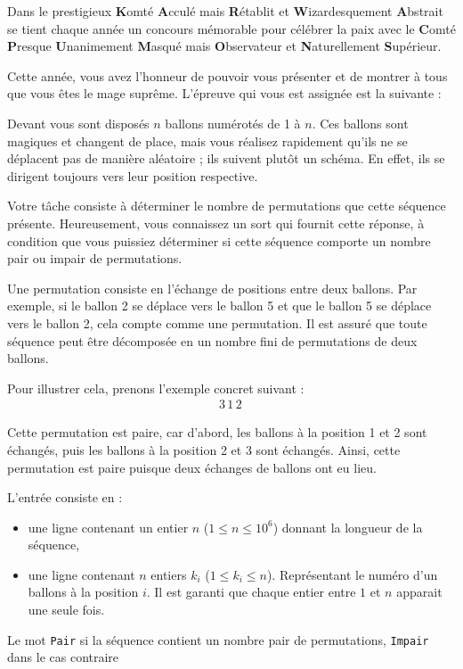 \problemname{\problemyamlname}


Dans le prestigieux \textbf{K}omté \textbf{A}cculé mais \textbf{R}établit et \textbf{W}izardesquement \textbf{A}bstrait se tient chaque année un concours mémorable pour célébrer la paix avec le \textbf{C}omté \textbf{P}resque \textbf{U}nanimement \textbf{M}asqué mais \textbf{O}bservateur et \textbf{N}aturellement \textbf{S}upérieur.

Cette année, vous avez l'honneur de pouvoir vous présenter et de montrer à tous que vous êtes le mage suprême. L'épreuve qui vous est assignée est la suivante :

Devant vous sont disposés $n$ ballons numérotés de 1 à $n$. Ces ballons sont magiques et changent de place, mais vous réalisez rapidement qu'ils ne se déplacent pas de manière aléatoire ; ils suivent plutôt un schéma. En effet, ils se dirigent toujours vers leur position respective.

Votre tâche consiste à déterminer le nombre de permutations que cette séquence présente. Heureusement, vous connaissez un sort qui fournit cette réponse, à condition que vous puissiez déterminer si cette séquence comporte un nombre pair ou impair de permutations.

Une permutation consiste en l'échange de positions entre deux ballons. Par exemple, si le ballon 2 se déplace vers le ballon 5 et que le ballon 5 se déplace vers le ballon 2, cela compte comme une permutation. Il est assuré que toute séquence peut être décomposée en un nombre fini de permutations de deux ballons.

Pour illustrer cela, prenons l'exemple concret suivant :
\begin{align*}
    3\, 1\, 2\,
\end{align*}

Cette permutation est paire, car d'abord, les ballons à la position 1 et 2 sont échangés, puis les ballons à la position 2 et 3 sont échangés. Ainsi, cette permutation est paire puisque deux échanges de ballons ont eu lieu.

\begin{Input}
    L'entrée consiste en :
    \begin{itemize}
        \item une ligne contenant un entier $n$ ($1 \le n \le 10^6$) donnant la longueur de la séquence,
        \item une ligne contenant $n$ entiers $k_i $ ($1 \le k_i \le n$). Représentant le numéro d'un ballons à la position $i$. Il est garanti que chaque entier entre $1$ et $n$ apparait une seule fois.
    \end{itemize}
\end{Input}

\begin{Output}
    Le mot \texttt{Pair} si la séquence contient un nombre pair de permutations, \texttt{Impair} dans le cas contraire
\end{Output}